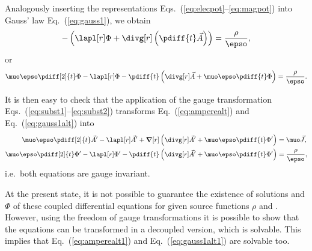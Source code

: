 \documentclass[10pt,a4paper]{article}
\newcommand*{\Eq}[1]{Eq.~(#1)}
\newcommand*{\Eqs}[1]{Eqs.~(#1)}
\begin{document}
Analogously inserting the representations 
\Eqs{\ref{eq:elecpot}--\ref{eq:magpot}} into Gauss' law \Eq{\ref{eq:gauss1}},
we obtain
\begin{align}
-\left(\lapl[r]\Phi + \divg[r]\left(\pdiff{t}\vec{A}\right)\right)
= \frac{\rho}{\epso}, 
\end{align}
or 
\begin{align}
\muo\epso\pdiff[2]{t}\Phi - \lapl[r]\Phi - 
\pdiff{t}\left(\divg[r]\vec{A} + \muo\epso\pdiff{t}\Phi\right)
=  \frac{\rho}{\epso}.\label{eq:gauss1alt}
\end{align}

It is then easy to check that the application of the gauge transformation
\Eqs{\ref{eq:subst1}--\ref{eq:subst2}} transforms 
\Eq{\ref{eq:amperealt}} and \Eq{\ref{eq:gauss1alt}}  into
\begin{align}
\muo\epso\pdiff[2]{t}\vec{A}^\prime - \lapl[r]\vec{A}^\prime + 
\grad[r]\left(\divg[r]\vec{A}^\prime + \muo\epso\pdiff{t}\Phi^\prime\right) & = 
\muo\vec{J},\label{eq:amperealt1}\\
\muo\epso\pdiff[2]{t}\Phi^\prime - \lapl[r]\Phi^\prime - 
\pdiff{t}\left(\divg[r]\vec{A}^\prime + \muo\epso\pdiff{t}\Phi^\prime\right)
& =  \frac{\rho}{\epso},\label{eq:gauss1alt1}
\end{align}
i.e.\ both equations are gauge invariant.

At the present state, it is not possible to  guarantee the existence of
solutions  and $\Phi$ of these coupled differential equations for given
source functions $\rho$ and . 
However, using the freedom of gauge transformations it
is possible to show that the equations can be transformed in a decoupled
version, which is solvable. 
This implies that \Eq{\ref{eq:amperealt1}} and \Eq{\ref{eq:gauss1alt1}} 
are solvable too.
\end{document}

